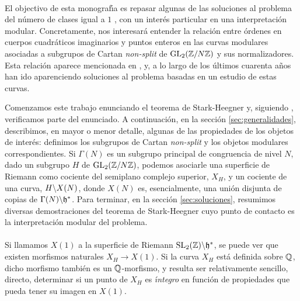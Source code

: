 
\paragraph{}
El objectivo de esta monograf\'{\i}a es repasar algunas de las soluciones al
problema del n\'{u}mero de clases igual a $1$%
, con un inter\'{e}s particular en una interpretaci\'{o}n modular. Concretamente,
nos interesar\'{a} entender la relaci\'{o}n entre \'{o}rdenes en cuerpos
cuadr\'{a}ticos imaginarios y puntos enteros en las curvas modulares asociadas a
subgrupos de Cartan \textit{non-split} de $\mathrm{GL}_{2}(\mathbb{Z}/N\mathbb{Z})$ y sus
normalizadores. Esta relaci\'{o}n aparece mencionada en \cite{serre}, y, a lo largo
de los \'{u}ltimos cuarenta a\~{n}os han ido aparenciendo soluciones al problema
basadas en un estudio de estas curvas.

Comenzamos este trabajo enunciando el teorema de Stark-Heegner y,
siguiendo \cite{serre}, verificamos parte del enunciado. A continuaci\'{o}n,
en la secci\'{o}n \ref{sec:generalidades},
describimos, en mayor o menor detalle, algunas de las
propiedades de los objetos de inter\'{e}s: definimos los subgrupos de Cartan
\textit{non-split} y los objetos modulares correspondientes. Si $\Gamma(N)$ es
un subgrupo principal de congruencia de nivel $N$, dado un subgrupo
$H$ de $\mathrm{GL}_{2}(\mathbb{Z}/N\mathbb{Z})$, podemos asociarle una superficie de Riemann
como cociente del semiplano complejo superior, $X_{H}$, y un cociente de una curva,
$H\backslash X(N)$, donde $X(N)$ es, esencialmente, una uni\'{o}n disjunta de copias
de $\Gamma(N)\backslash\mathfrak{h}^{*}$.
%
Para terminar, en la secci\'{o}n \ref{sec:soluciones}, resumimos diversas
demostraciones del teorema de Stark-Heegner cuyo punto de contacto es la
interpretaci\'{o}n modular del problema.

\paragraph{}
Si llamamos $X(1)$ a la superficie de Riemann $\mathrm{SL}_{2}(\mathbb{Z})\backslash\mathfrak{h}^{*}$,
se puede ver que existen morfismos naturales $X_{H}\rightarrow X(1)$. Si la
curva $X_{H}$ est\'{a} definida sobre $\mathbb{Q}$, dicho morfismo tambi\'{e}n
es un $\mathbb{Q}$-morfismo, y resulta ser relativamente sencillo, directo,
determinar si un punto de $X_{H}$ es \emph{\'{\i}ntegro} en funci\'{o}n de
propiedades que pueda tener su imagen en $X(1)$.

